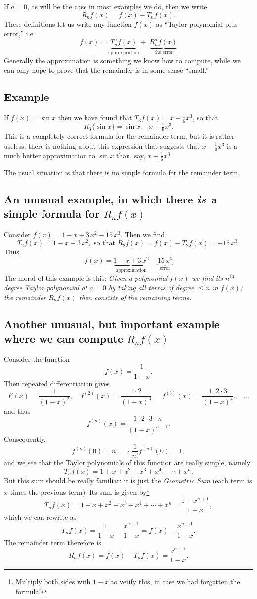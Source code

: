 If $a=0$, as will be the case in most examples we do, then we write
\[
R_nf(x)=f (x)-T_nf (x).
\]
These definitions let us write any function $f(x)$ as ``Taylor polynomial plus
error,'' i.e.
\begin{equation}
  f(x) = \underbrace{T_n^af(x)}_{\text{approximation}}  + 
  \; \underbrace{R_n^af(x)}_{\text{the error}}
\end{equation}
Generally the approximation is something we know how to compute, while we can
only hope to prove that the remainder is in some sense ``small.''

\subsection{Example} %
If $f(x)=\sin x$ then we have found that $T_3f(x)= x-\tfrac16x^3$, so that
\[
R_3\{\sin x\} = \sin x -x + \tfrac16x^3.
\]
This is a completely correct formula for the remainder term, but it is
rather useless: there is nothing about this expression that suggests that
$x-\tfrac16x^3$ is a much better approximation to $\sin x$ than, say,
$x+\tfrac16x^3$.

The usual situation is that there is no simple formula for the remainder
term.

\subsection{An unusual example, in which there \emph{is\,} a simple formula for $R_nf(x)$} %
Consider $f(x)= 1-x+3\,x^2-15\,x^3$.  Then we find
\[
T_2f(x) = 1-x+3\,x^2, \text{ so that } R_2f(x) = f(x)-T_2f(x) = -15\,x^3.
\]
Thus
\[
  f(x) = \underbrace{1-x+3\,x^2}_{\text{approximation}}
  - \underbrace{15\,x^3}_{\text{error}}
\]
The moral of this example is this: \textit{Given a polynomial $f(x)$ we
find its $n^{\text{th}}$ degree Taylor polynomial at $a=0$ by taking all terms of
degree $\leq n$ in $f(x)$; the remainder $R_nf(x)$ then consists of the
remaining terms.}

\subsection{Another unusual, but important example where we can compute %
$R_nf(x)$}
Consider the function
\[
f (x) = \frac 1{1-x}.
\]
Then repeated differentiation gives
\[
f' (x) = \frac{1}{(1-x)^2},\quad f^{(2)}(x)=\frac{1\cdot2}{(1-x)^3},\quad
f^{(3)}(x)=\frac{1\cdot2\cdot3}{(1-x)^4},\quad\ldots
\]
and thus
\[
f^{(n)}(x)=\frac{1\cdot2\cdot3\cdots n}{(1-x)^{n+1}}.
\]
Consequently,
\[
f^{(n)} (0) = n! \implies \frac{1}{n!}f^{(n)}(0) = 1,
\]
and we see that the Taylor polynomials of this function are really simple,
namely
\[
T_nf(x) = 1+x+x^2+x^3+x^4+\cdots+x^n.
\]
But this sum should be really familiar: it is just the \emph{Geometric Sum}
(each term is $x$ times the previous term).  Its sum is given
by\footnote{Multiply both sides with $1-x$ to verify this, in case we had
forgotten the formula!}
\[
T_nf(x) = 1+x+x^2+x^3+x^4+\cdots+x^n =\frac{1-x^{n+1}}{1-x},
\]
which we can rewrite as
\[
T_nf(x) = \frac1{1-x} -\frac{x^{n+1}}{1-x} = f(x) -\frac{x^{n+1}}{1-x} .
\]
The remainder term therefore is
\[
R_nf(x) = f(x) -T_nf(x) =\frac{x^{n+1}}{1-x}.
\]



